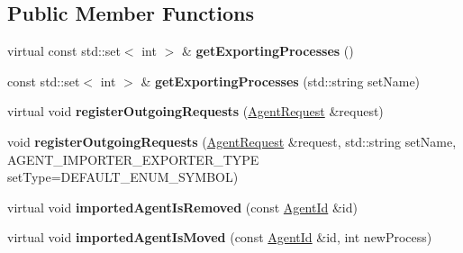 \subsection*{Public Member Functions}
\begin{DoxyCompactItemize}
\item 
\hypertarget{classrepast_1_1_importer_exporter___b_y___s_e_t_aecb47913ae4c330551286d972a8ac4ad}{virtual const std\-::set$<$ int $>$ \& {\bfseries get\-Exporting\-Processes} ()}\label{classrepast_1_1_importer_exporter___b_y___s_e_t_aecb47913ae4c330551286d972a8ac4ad}

\item 
\hypertarget{classrepast_1_1_importer_exporter___b_y___s_e_t_ae083fd746ee19bd910f53772fd946702}{const std\-::set$<$ int $>$ \& {\bfseries get\-Exporting\-Processes} (std\-::string set\-Name)}\label{classrepast_1_1_importer_exporter___b_y___s_e_t_ae083fd746ee19bd910f53772fd946702}

\item 
\hypertarget{classrepast_1_1_importer_exporter___b_y___s_e_t_aba0ac96cc448d3393ea83a82ce4ce9ca}{virtual void {\bfseries register\-Outgoing\-Requests} (\hyperlink{classrepast_1_1_agent_request}{Agent\-Request} \&request)}\label{classrepast_1_1_importer_exporter___b_y___s_e_t_aba0ac96cc448d3393ea83a82ce4ce9ca}

\item 
\hypertarget{classrepast_1_1_importer_exporter___b_y___s_e_t_a93fd8bbbdebf03d145ede0af6b80c07d}{void {\bfseries register\-Outgoing\-Requests} (\hyperlink{classrepast_1_1_agent_request}{Agent\-Request} \&request, std\-::string set\-Name, A\-G\-E\-N\-T\-\_\-\-I\-M\-P\-O\-R\-T\-E\-R\-\_\-\-E\-X\-P\-O\-R\-T\-E\-R\-\_\-\-T\-Y\-P\-E set\-Type=D\-E\-F\-A\-U\-L\-T\-\_\-\-E\-N\-U\-M\-\_\-\-S\-Y\-M\-B\-O\-L)}\label{classrepast_1_1_importer_exporter___b_y___s_e_t_a93fd8bbbdebf03d145ede0af6b80c07d}

\item 
\hypertarget{classrepast_1_1_importer_exporter___b_y___s_e_t_a669356de5e51cd3e2225521ee234d9e9}{virtual void {\bfseries imported\-Agent\-Is\-Removed} (const \hyperlink{classrepast_1_1_agent_id}{Agent\-Id} \&id)}\label{classrepast_1_1_importer_exporter___b_y___s_e_t_a669356de5e51cd3e2225521ee234d9e9}

\item 
\hypertarget{classrepast_1_1_importer_exporter___b_y___s_e_t_a2a72cb02534f10f9da5a913d1cd09a85}{virtual void {\bfseries imported\-Agent\-Is\-Moved} (const \hyperlink{classrepast_1_1_agent_id}{Agent\-Id} \&id, int new\-Process)}\label{classrepast_1_1_importer_exporter___b_y___s_e_t_a2a72cb02534f10f9da5a913d1cd09a85}


\end{DoxyCompactItemize}
